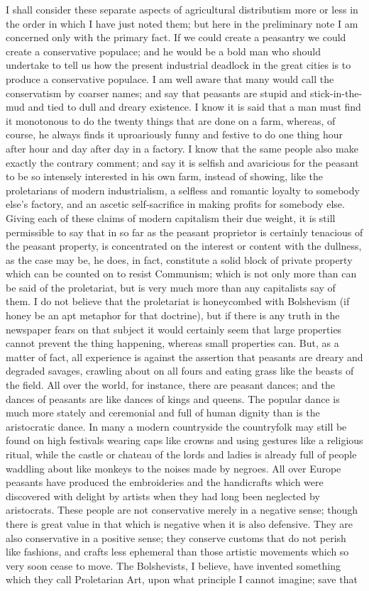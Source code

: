 \documentclass{book}
\begin{document}
I shall consider these separate aspects of agricultural distributism more or less in the order in which I have just noted them; but here in the preliminary note I am concerned only with the primary fact. If we could create a peasantry we could create a conservative populace; and he would be a bold man who should undertake to tell us how the present industrial deadlock in the great cities is to produce a conservative populace. I am well aware that many would call the conservatism by coarser names; and say that peasants are stupid and stick-in-the-mud and tied to dull and dreary existence. I know it is said that a man must find it monotonous to do the twenty things that are done on a farm, whereas, of course, he always finds it uproariously funny and festive to do one thing hour after hour and day after day in a factory. I know that the same people also make exactly the contrary comment; and say it is selfish and avaricious for the peasant to be so intensely interested in his own farm, instead of showing, like the proletarians of modern industrialism, a selfless and romantic loyalty to somebody else’s factory, and an ascetic self-sacrifice in making profits for somebody else. Giving each of these claims of modern capitalism their due weight, it is still permissible to say that in so far as the peasant proprietor is certainly tenacious of the peasant property, is concentrated on the interest or content with the dullness, as the case may be, he does, in fact, constitute a solid block of private property which can be counted on to resist Communism; which is not only more than can be said of the proletariat, but is very much more than any capitalists say of them. I do not believe that the proletariat is honeycombed with Bolshevism (if honey be an apt metaphor for that doctrine), but if there is any truth in the newspaper fears on that subject it would certainly seem that large properties cannot prevent the thing happening, whereas small properties can. But, as a matter of fact, all experience is against the assertion that peasants are dreary and degraded savages, crawling about on all fours and eating grass like the beasts of the field. All over the world, for instance, there are peasant dances; and the dances of peasants are like dances of kings and queens. The popular dance is much more stately and ceremonial and full of human dignity than is the aristocratic dance. In many a modern countryside the countryfolk may still be found on high festivals wearing caps like crowns and using gestures like a religious ritual, while the castle or chateau of the lords and ladies is already full of people waddling about like monkeys to the noises made by negroes. All over Europe peasants have produced the embroideries and the handicrafts which were discovered with delight by artists when they had long been neglected by aristocrats. These people are not conservative merely in a negative sense; though there is great value in that which is negative when it is also defensive. They are also conservative in a positive sense; they conserve customs that do not perish like fashions, and crafts less ephemeral than those artistic movements which so very soon cease to move. The Bolshevists, I believe, have invented something which they call Proletarian Art, upon what principle I cannot imagine; save that 
\end{document}
